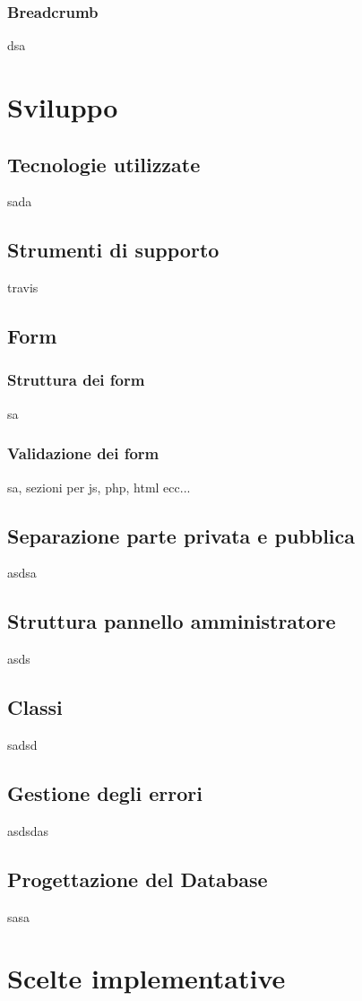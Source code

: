 \documentclass[12pt]{article}
\begin{document}
	\subsubsection{Breadcrumb}
	dsa
	

	\section{Sviluppo}
	\subsection{Tecnologie utilizzate}
	sada
	\subsection{Strumenti di supporto}
	travis
	\subsection{Form}
	\subsubsection{Struttura dei form}
	sa
	\subsubsection{Validazione dei form}
	sa, sezioni per js, php, html ecc...
	\subsection{Separazione parte privata e pubblica}
	asdsa
	\subsection{Struttura pannello amministratore}
	asds
	\subsection{Classi}
	sadsd
	\subsection{Gestione degli errori}
	asdsdas
	\subsection{Progettazione del Database}
	sasa
	
	\section{Scelte implementative}
\end{document}
